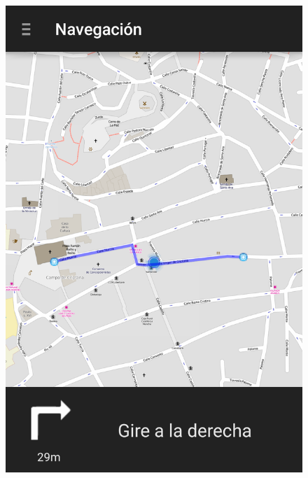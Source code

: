 \begin{slide}
  \begin{center}
    \begin{figure}[!h]
      \includegraphics[height=0.8\textheight]{img/naviganto-rutaderecha.png}
    \end{figure}
  \end{center}
\end{slide}

